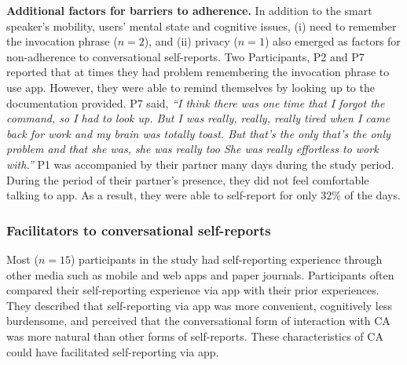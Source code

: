          
        \textbf{Additional factors for barriers to adherence. } 
        In addition to the smart speaker's mobility, users' mental state and cognitive issues, (i) need to remember the invocation phrase ($n=2$), and (ii) privacy ($n=1$) also emerged as factors for non-adherence to conversational self-reports. 
        Two Participants, P2 and P7 reported that at times they had problem remembering the invocation phrase to use \acl{app}. However, they were able to remind themselves by looking up to the documentation provided. P7 said,
            \textit{``I think there was one time that I forgot the command, so I had to look up.
            But I was really, really, really tired when I came back for work and my brain was totally toast. But that's the only that's the only problem and that she was, she was really too She was really effortless to work with.''}
        P1 was accompanied by their partner many days during the study period. During the period of their partner's presence, they did not feel comfortable talking to \acl{app}. As a result, they were able to self-report for only $32\%$ of the days.
        

        
        
    \subsubsection{Facilitators to conversational self-reports}
        Most ($n=15$) participants in the study had self-reporting experience through other media such as mobile and web apps and paper journals.
        Participants often compared their self-reporting experience via \acl{app} with their prior experiences.  
        They described that self-reporting via \acl{app} was more convenient, cognitively less burdensome, and perceived that the conversational form of interaction with \ac{CA} was more natural than other forms of self-reports. 
        These characteristics of \ac{CA} could have facilitated self-reporting via \acl{app}.

